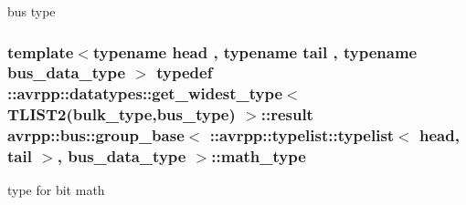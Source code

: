 bus type 

\hypertarget{structavrpp_1_1bus_1_1group__base_3_01_1_1avrpp_1_1typelist_1_1typelist_3_01head_00_01tail_01_4_00_01bus__data__type_01_4_a1b71ab19a4efd082314f453d54061651}{
\subsubsection[{math\_\-type}]{\setlength{\rightskip}{0pt plus 5cm}template$<$typename head , typename tail , typename bus\_\-data\_\-type $>$ typedef ::avrpp::datatypes::get\_\-widest\_\-type$<$ TLIST2({\bf bulk\_\-type},{\bf bus\_\-type}) $>$::result avrpp::bus::group\_\-base$<$ ::{\bf avrpp::typelist::typelist}$<$ head, tail $>$, bus\_\-data\_\-type $>$::{\bf math\_\-type}}}
\label{structavrpp_1_1bus_1_1group__base_3_01_1_1avrpp_1_1typelist_1_1typelist_3_01head_00_01tail_01_4_00_01bus__data__type_01_4_a1b71ab19a4efd082314f453d54061651}


type for bit math 



